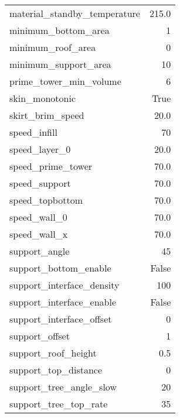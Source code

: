 \begin{multicols}{2}
\begin{table}[H]
\begin{tabular}{|l|r|}
            material\_standby\_temperature        & 215.0          \\
            minimum\_bottom\_area                 & 1              \\
            minimum\_roof\_area                   & 0              \\
            minimum\_support\_area                & 10             \\
            prime\_tower\_min\_volume             & 6              \\
            skin\_monotonic                       & True           \\
            skirt\_brim\_speed                    & 20.0           \\
            speed\_infill                         & 70             \\
            speed\_layer\_0                       & 20.0           \\
            speed\_prime\_tower                   & 70.0           \\
            speed\_support                        & 70.0           \\
            speed\_topbottom                      & 70.0           \\
            speed\_wall\_0                        & 70.0           \\
            speed\_wall\_x                        & 70.0           \\
            support\_angle                        & 45             \\
            support\_bottom\_enable               & False          \\
            support\_interface\_density           & 100            \\
            support\_interface\_enable            & False          \\
            support\_interface\_offset            & 0              \\
            support\_offset                       & 1              \\
            support\_roof\_height                 & 0.5            \\
            support\_top\_distance                & 0              \\
            support\_tree\_angle\_slow            & 20             \\
            support\_tree\_top\_rate              & 35             \\

\end{tabular}
\end{table}
\end{multicols}
